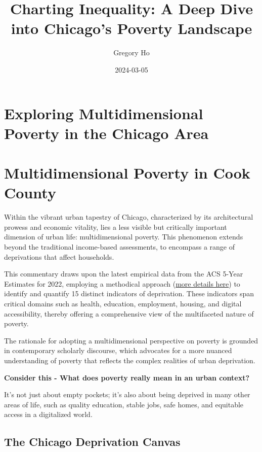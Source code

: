 \documentclass[
  letterpaper,
  DIV=11,
  numbers=noendperiod]{scrreprt}
\title{Charting Inequality: A Deep Dive into Chicago's Poverty
Landscape}
\author{Gregory Ho}
\date{2024-03-05}
\renewcommand*\contentsname{Table of contents}
\newcommand\contentsname{Table of contents}
\begin{document}
\maketitle

\renewcommand*\contentsname{Table of contents}
{
\hypersetup{linkcolor=}
\setcounter{tocdepth}{2}
\tableofcontents
}

\chapter{Exploring Multidimensional Poverty in the Chicago
Area}\label{exploring-multidimensional-poverty-in-the-chicago-area}


\chapter{Multidimensional Poverty in Cook
County}\label{multidimensional-poverty-in-cook-county}

Within the vibrant urban tapestry of Chicago, characterized by its
architectural prowess and economic vitality, lies a less visible but
critically important dimension of urban life: multidimensional poverty.
This phenomenon extends beyond the traditional income-based assessments,
to encompass a range of deprivations that affect households.

This commentary draws upon the latest empirical data from the ACS 5-Year
Estimates for 2022, employing a methodical approach
(\href{multidimensional_poverty.qmd}{more details here}) to identify and
quantify 15 distinct indicators of deprivation. These indicators span
critical domains such as health, education, employment, housing, and
digital accessibility, thereby offering a comprehensive view of the
multifaceted nature of poverty.

The rationale for adopting a multidimensional perspective on poverty is
grounded in contemporary scholarly discourse, which advocates for a more
nuanced understanding of poverty that reflects the complex realities of
urban deprivation.

\textbf{Consider this - What does poverty really mean in an urban
context?}

It's not just about empty pockets; it's also about being deprived in
many other areas of life, such as quality education, stable jobs, safe
homes, and equitable access in a digitalized world.

\section{The Chicago Deprivation
Canvas}\label{the-chicago-deprivation-canvas}
\end{document}
